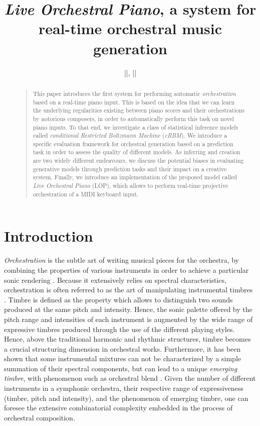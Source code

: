 \documentclass[letterpaper]{article}
\title{\textit{Live Orchestral Piano}, a system for real-time orchestral music generation}
\author{||, ||\\}
\begin{document}
 
\maketitle
\begin{abstract}
\begin{quote}
This paper introduces the first system for performing automatic \textit{orchestration} based on a real-time piano input. This is based on the idea that we can learn the underlying regularities existing between piano scores and their orchestrations by notorious composers, in order to automatically perform this task on novel piano inputs. To that end, we investigate a class of statistical inference models called \textit{conditional Restricted Boltzmann Machine} (\textit{cRBM}). We introduce a specific evaluation framework for orchestral generation based on a prediction task in order to assess the quality of different models. As inferring and creation are two widely different endeavours, we discuss the potential biases in evaluating generative models through prediction tasks and their impact on a creative system. Finally, we introduce an implementation of the proposed model called \textit{Live Orchestral Piano} (LOP), which allows to perform real-time projective orchestration of a MIDI keyboard input.
\end{quote}
\end{abstract}

\section{Introduction}
\textit{Orchestration} is the subtle art of writing musical pieces for the orchestra, by combining the properties of various instruments in order to achieve a particular sonic rendering \cite{koechli_orch,Rimsky-Korsakov:1873aa}. Because it extensively relies on spectral characteristics, orchestration is often referred to as the art of manipulating instrumental timbres \cite{mcadams2013timbre}. Timbre is defined as the property which allows to distinguish two sounds produced at the same pitch and intensity.
Hence, the sonic palette offered by the pitch range and intensities of each instrument is augmented by the wide range of expressive timbres produced through the use of the different playing styles.
Hence, above the traditional harmonic and rhythmic structures, timbre becomes a crucial structuring dimension in orchestral works. Furthermore, it has been shown that some instrumental mixtures can not be characterized by a simple summation of their spectral components, but can lead to a unique \textit{emerging timbre}, with phenomenon such as orchestral blend \cite{tardieu2012perception}.
Given the number of different instruments in a symphonic orchestra, their respective range of expressiveness (timbre, pitch and intensity), and the phenomenon of emerging timbre, one can foresee the extensive combinatorial complexity embedded in the process of orchestral composition.
\end{document}
